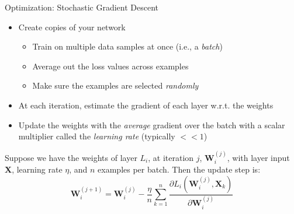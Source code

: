 \documentclass{beamer}
\begin{document}
\begin{frame}{Optimization: Stochastic Gradient Descent}
    \begin{itemize}
        \item Create copies of your network
        \begin{itemize}
            \item Train on multiple data samples at once (i.e., a \textit{batch})
            \item Average out the loss values across examples
            \item Make sure the examples are selected \textit{randomly}
        \end{itemize}
        \item At each iteration, estimate the gradient of each layer w.r.t. the weights
        \item Update the weights with the \textit{average} gradient over the batch with a scalar multiplier called the \textit{learning rate} (typically $<< 1$)
    \end{itemize}

    Suppose we have the weights of layer $L_i$, at iteration $j$, $\bm{W}_i^{(j)}$, with layer input $\bm{X}$, learning rate $\eta$, and $n$ examples per batch. Then the update step is:
    \[
        \bm{W}_i^{(j+1)} = \bm{W}_i^{(j)} - \frac{\eta}{n}\sum_{k=1}^n \frac{\partial L_i(\bm{W}_i^{(j)}, \bm{X}_k)}{\partial \bm{W}_i^{(j)}}
    \]
\end{frame}
\end{document}
